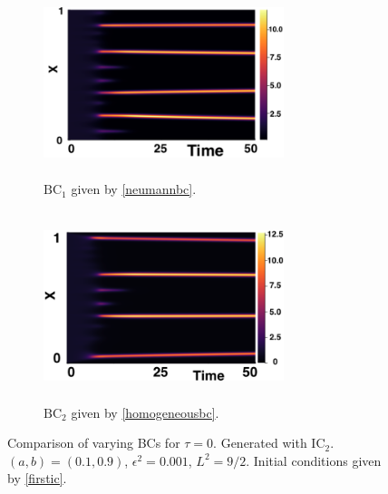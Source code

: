 \begin{figure}[H]
    \centering
    \begin{subfigure}[b]{0.45\textwidth}
        \centering
        \includegraphics[width=7cm,height=5.5cm]{ic20.png}
        \caption{$\text{BC}_1$ given by \eqref{neumannbc}.}
        \label{}
    \end{subfigure}
    \hfill
    \begin{subfigure}[b]{0.45\textwidth}
        \centering
        \includegraphics[width=7cm,height=5.5cm]{bc0.png}
        \caption{$\text{BC}_2$ given by \eqref{homogeneousbc}.}
        \label{}
    \end{subfigure}
    \caption{Comparison of varying BCs for $\tau=0$. Generated with $\text{IC}_2$. $(a,b)=(0.1,0.9)$, $\epsilon^2=0.001$, $L^2=9/2$. Initial conditions given by \eqref{firstic}.}
    \label{fig:bctau1}
\end{figure}

